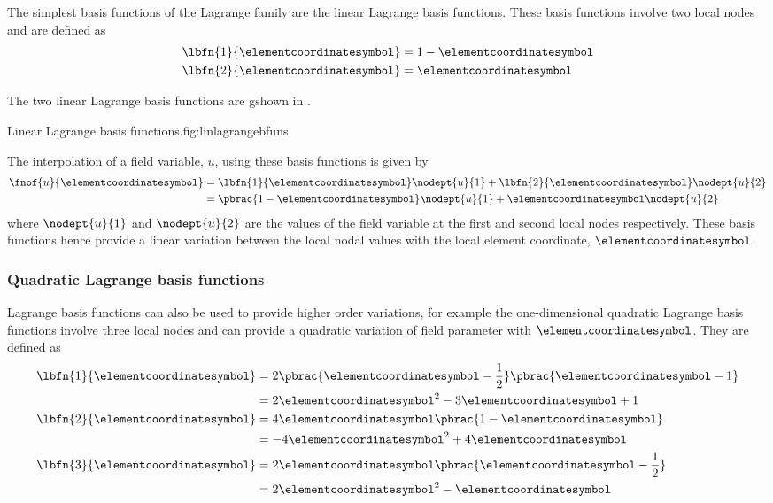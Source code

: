 The simplest basis functions of the Lagrange family are the \onedal linear
Lagrange basis functions. These basis functions involve two local nodes and
are defined as
\begin{equation}
  \begin{split}
    \lbfn{1}{\elementcoordinatesymbol}&=1-\elementcoordinatesymbol \\
    \lbfn{2}{\elementcoordinatesymbol}&=\elementcoordinatesymbol
  \end{split}
  \label{eqn:linearlbfuns}
\end{equation}

The two \onedal linear Lagrange basis functions are gshown in .

{Linear Lagrange basis functions.}{fig:linlagrangebfuns}

The interpolation of a field variable, $u$, using these basis functions is
given by
\begin{equation}
  \begin{split}
    \fnof{u}{\elementcoordinatesymbol}&=\lbfn{1}{\elementcoordinatesymbol}\nodept{u}{1}+\lbfn{2}{\elementcoordinatesymbol}\nodept{u}{2} \\
    &=\pbrac{1-\elementcoordinatesymbol}\nodept{u}{1}+\elementcoordinatesymbol\nodept{u}{2}
  \end{split}
\end{equation}
where $\nodept{u}{1}$ and $\nodept{u}{2}$ are the values of the field variable at
the first and second local nodes respectively. These basis functions hence
provide a linear variation between the local nodal values with the local
element coordinate, $\elementcoordinatesymbol$.

\subsubsection{Quadratic Lagrange basis functions}

Lagrange basis functions can also be used to provide higher order variations,
for example the one-dimensional quadratic Lagrange basis functions involve
three local nodes and can provide a quadratic variation of field parameter
with $\elementcoordinatesymbol$. They are defined as
\begin{equation}
  \begin{split}
    \lbfn{1}{\elementcoordinatesymbol}&=2\pbrac{\elementcoordinatesymbol-\frac12}\pbrac{\elementcoordinatesymbol-1} \\
    &=2\elementcoordinatesymbol^{2}-3\elementcoordinatesymbol+1\\
    \lbfn{2}{\elementcoordinatesymbol}&=4\elementcoordinatesymbol\pbrac{1-\elementcoordinatesymbol} \\
    &=-4\elementcoordinatesymbol^{2}+4\elementcoordinatesymbol\\
    \lbfn{3}{\elementcoordinatesymbol}&=2\elementcoordinatesymbol\pbrac{\elementcoordinatesymbol-\frac12}\\
    &=2\elementcoordinatesymbol^{2}-\elementcoordinatesymbol
  \end{split}
  \label{eqn:quadraticlbfuns}
\end{equation}

